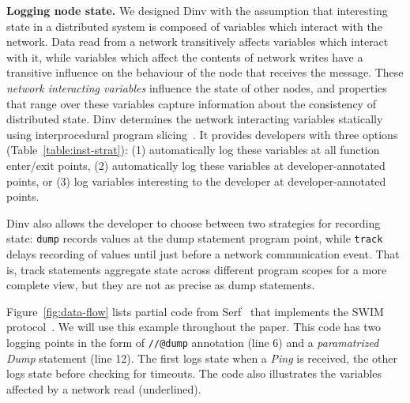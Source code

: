 \textbf{Logging node state.} We designed Dinv with the assumption that
interesting state in a distributed system is composed of variables
which interact with the network. Data read from a network transitively
affects variables which interact with it, while variables which affect
the contents of network writes have a transitive influence on the
behaviour of the node that receives the message. These \emph{network
  interacting variables} influence the state of other nodes, and
properties that range over these variables capture information about
the consistency of distributed state. Dinv determines the network
interacting variables statically using interprocedural program
slicing~\cite{Ottenstein:1984, Walkinshaw03thejava}. It provides
developers with three options (Table~\ref{table:inst-strat}): (1)
automatically log these variables at all function enter/exit points,
(2) automatically log these variables at developer-annotated points,
or (3) log variables interesting to the developer at
developer-annotated points.

Dinv also allows the developer to choose between two strategies for
recording state: {\tt dump} records values at the dump statement
program point, while {\tt track} delays recording of values until
just before a network communication event. That is, track statements
aggregate state across different program scopes for a more complete
view, but they are not as precise as dump statements.


Figure~\ref{fig:data-flow} lists partial code from Serf~\cite{serf}
that implements the SWIM protocol~\cite{das2002swim}. We will use this
example throughout the paper.
This code has two logging points in the form of {\tt //@dump}
annotation (line 6) and a \emph{paramatrized Dump} statement
(line 12). The first logs state when a \emph{Ping} is received, the
other logs state before checking for timeouts. The code also
illustrates the variables affected by a network read (underlined).
%

